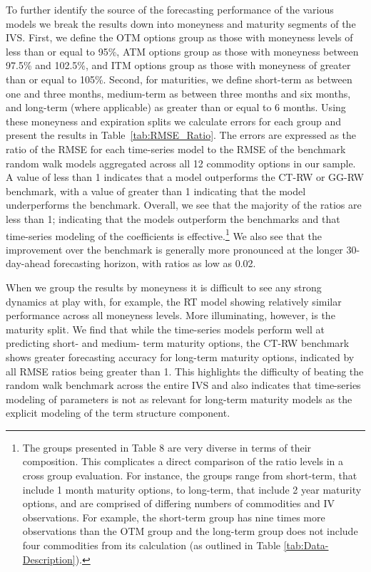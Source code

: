 \documentclass[12pt,a4paper]{article}
\begin{document}
To further identify the source of the forecasting performance of the various models we break the results down into moneyness and maturity segments of the IVS. First, we define the OTM options group as those with moneyness levels of less than or equal to 95\%, ATM options group as those with moneyness between 97.5\% and 102.5\%, and ITM options group as those with moneyness of greater than or equal to 105\%. Second, for maturities, we define short-term as between one and three months, medium-term as between three months and six months, and long-term (where applicable) as greater than or equal to 6 months. Using these moneyness and expiration splits we calculate errors for each group and present the results in Table~\ref{tab:RMSE_Ratio}. The errors are expressed as the ratio of the RMSE for each time-series model to the RMSE of the benchmark random walk models aggregated across all 12 commodity options in our sample. A value of less than 1 indicates that a model outperforms the CT-RW or GG-RW benchmark, with a value of greater than 1 indicating that the model underperforms the benchmark. Overall, we see that the majority of the ratios are less than 1; indicating that the models outperform the benchmarks and that time-series modeling of the coefficients is effective.\footnote{The groups presented in Table 8 are very diverse in terms of their composition. This complicates a direct comparison of the ratio levels in a cross group evaluation. For instance, the groups range from short-term, that include 1 month maturity options, to long-term, that include 2 year maturity options, and are comprised of differing numbers of commodities and IV observations. For example, the short-term group has nine times more observations than the OTM group and the long-term group does not include four commodities from its calculation (as outlined in Table \ref{tab:Data-Description}).} We also see that the improvement over the benchmark is generally more pronounced at the longer 30-day-ahead forecasting horizon, with ratios as low as 0.02.

When we group the results by moneyness it is difficult to see any strong dynamics at play with, for example, the RT model showing relatively similar performance across all moneyness levels. More illuminating, however, is the maturity split. We find that while the time-series models perform well at predicting short- and medium- term maturity options, the CT-RW benchmark shows greater forecasting accuracy for long-term maturity options, indicated by all RMSE ratios being greater than 1. This highlights the difficulty of beating the random walk benchmark across the entire IVS and also indicates that time-series modeling of parameters is not as relevant for long-term maturity models as the explicit modeling of the term structure component.
\end{document}
